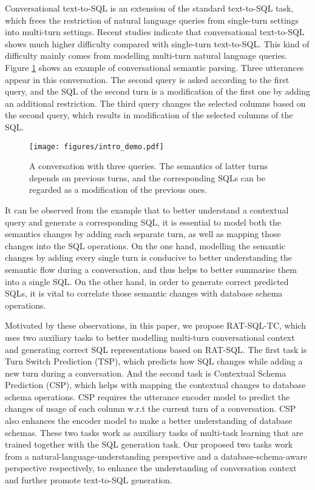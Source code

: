 \documentclass[a4paper]{article}
\begin{document}
Conversational text-to-SQL is an extension of the standard text-to-SQL task, which frees the restriction of natural language queries from single-turn settings into multi-turn settings. Recent studies \cite{yu2019sparc,zhong2020grounded,zhang2019editing} indicate that conversational text-to-SQL shows much higher difficulty compared with single-turn text-to-SQL. This kind of difficulty mainly comes from modelling multi-turn natural language queries. 
Figure \ref{fig:intro_demo} shows an example of conversational semantic parsing. Three utterances appear in this conversation. The second query is asked according to the first query, and the SQL of the second turn is a modification of the first one by adding an additional restriction. The third query changes the selected columns based on the second query, which results in modification of the selected columns of the SQL.

\begin{figure}[htbp]
    \centering
    \texttt{[image: figures/intro\_demo.pdf]}
    \caption{A conversation with three queries. The semantics of latter turns depends on previous turns, and the corresponding SQLs can be regarded as a modification of the previous ones.}
    \label{fig:intro_demo}
\end{figure}

It can be observed from the example that to better understand a contextual query and generate a corresponding SQL, it is essential to model both the semantics changes by adding each separate turn, as well as mapping those changes into the SQL operations.
On the one hand, modelling the semantic changes by adding every single turn is conducive to better understanding the semantic flow during a conversation, and thus helps to better summarise them into a single SQL. On the other hand, in order to generate correct predicted SQLs, it is vital to correlate those semantic changes with database schema operations.

Motivated by these observations, in this paper, we propose RAT-SQL-TC, which uses two auxiliary tasks to better modelling multi-turn conversational context and generating correct SQL representations based on RAT-SQL\cite{wang2019rat}. The first task is Turn Switch Prediction (TSP), which predicts how SQL changes while adding a new turn during a conversation. And the second task is Contextual Schema Prediction (CSP), which helps with mapping the contextual changes to database schema operations. CSP requires the utterance encoder model to predict the changes of usage of each column w.r.t the current turn of a conversation. CSP also enhances the encoder model to make a better understanding of database schemas. These two tasks work as auxiliary tasks of multi-task learning that are trained together with the SQL generation task. Our proposed two tasks work from a natural-language-understanding perspective and a database-schema-aware perspective respectively, to enhance the understanding of conversation context and further promote text-to-SQL generation.
\end{document}
